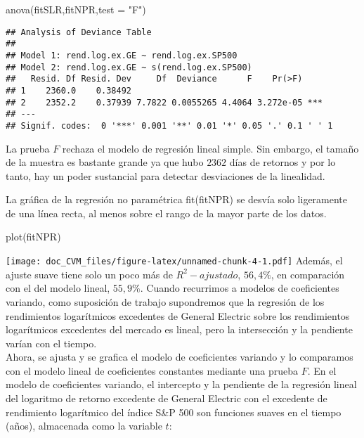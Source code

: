 \documentclass[
]{article}
\newenvironment{Shaded}{\begin{snugshade}}{\end{snugshade}}
\newcommand{\AttributeTok}[1]{\textcolor[rgb]{0.77,0.63,0.00}{#1}}
\newcommand{\FunctionTok}[1]{\textcolor[rgb]{0.00,0.00,0.00}{#1}}
\newcommand{\NormalTok}[1]{#1}
\newcommand{\StringTok}[1]{\textcolor[rgb]{0.31,0.60,0.02}{#1}}
\begin{document}
\begin{Shaded}
\begin{Highlighting}[]
\FunctionTok{anova}\NormalTok{(fitSLR,fitNPR,}\AttributeTok{test =} \StringTok{"F"}\NormalTok{)}
\end{Highlighting}
\end{Shaded}

\begin{verbatim}
## Analysis of Deviance Table
## 
## Model 1: rend.log.ex.GE ~ rend.log.ex.SP500
## Model 2: rend.log.ex.GE ~ s(rend.log.ex.SP500)
##   Resid. Df Resid. Dev     Df  Deviance      F    Pr(>F)    
## 1    2360.0    0.38492                                      
## 2    2352.2    0.37939 7.7822 0.0055265 4.4064 3.272e-05 ***
## ---
## Signif. codes:  0 '***' 0.001 '**' 0.01 '*' 0.05 '.' 0.1 ' ' 1
\end{verbatim}

La prueba \(F\) rechaza el modelo de regresión lineal simple. Sin
embargo, el tamaño de la muestra es bastante grande ya que hubo \(2362\)
días de retornos y por lo tanto, hay un poder sustancial para detectar
desviaciones de la linealidad.

La gráfica de la regresión no paramétrica fit(fitNPR) se desvía solo
ligeramente de una línea recta, al menos sobre el rango de la mayor
parte de los datos.

\begin{Shaded}
\begin{Highlighting}[]
\FunctionTok{plot}\NormalTok{(fitNPR)}
\end{Highlighting}
\end{Shaded}

\texttt{[image: doc\_CVM\_files/figure-latex/unnamed-chunk-4-1.pdf]}
Además, el ajuste suave tiene solo un poco más de \(R^2-ajustado\),
\(56,4\%\), en comparación con el del modelo lineal, \(55,9\%\). Cuando
recurrimos a modelos de coeficientes variando, como suposición de
trabajo supondremos que la regresión de los rendimientos logarítmicos
excedentes de General Electric sobre los rendimientos logarítmicos
excedentes del mercado es lineal, pero la intersección y la pendiente
varían con el tiempo.\\
Ahora, se ajusta y se grafica el modelo de coeficientes variando y lo
comparamos con el modelo lineal de coeficientes constantes mediante una
prueba \(F\). En el modelo de coeficientes variando, el intercepto y la
pendiente de la regresión lineal del logaritmo de retorno excedente de
General Electric con el excedente de rendimiento logarítmico del índice
S\&P 500 son funciones suaves en el tiempo (años), almacenada como la
variable \(t\):
\end{document}
